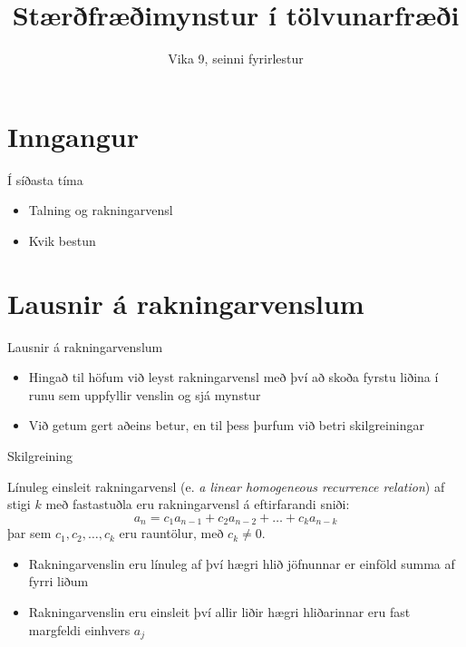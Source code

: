 \documentclass[handout]{beamer}
\title{Stærðfræðimynstur í tölvunarfræði}
\subtitle{Vika 9, seinni fyrirlestur}
\begin{document}
\begin{frame}
\titlepage
\end{frame}


\section{Inngangur}

\begin{frame}{Í síðasta tíma}
    \begin{itemize}
    \item Talning og rakningarvensl
    \item Kvik bestun
    \end{itemize}
\end{frame}

\section{Lausnir á rakningarvenslum}

\begin{frame}{Lausnir á rakningarvenslum}
\begin{itemize}
 \item Hingað til höfum við leyst rakningarvensl með því að skoða fyrstu liðina í runu sem uppfyllir venslin og sjá mynstur
 \item Við getum gert aðeins betur, en til þess þurfum við betri skilgreiningar
\end{itemize}
\end{frame}

\begin{frame}{Skilgreining}
\begin{tcolorbox}[title=Línuleg einsleit rakningarvensl með fastastuðlum]
Línuleg einsleit rakningarvensl (e. \emph{a linear homogeneous recurrence relation}) af stigi $k$ með fastastuðla eru rakningarvensl á eftirfarandi sniði:
\[
 a_n = c_1 a_{n-1} + c_2a_{n-2} + \ldots + c_ka_{n-k}
\]
þar sem $c_1, c_2, \ldots, c_k$ eru rauntölur, með $c_k \neq 0$.
\end{tcolorbox}
\begin{itemize}
 \item Rakningarvenslin eru línuleg af því hægri hlið jöfnunnar er einföld summa af fyrri liðum
 \item Rakningarvenslin eru einsleit því allir liðir hægri hliðarinnar eru fast margfeldi einhvers $a_j$
\end{itemize}
\end{frame}
\end{document}
